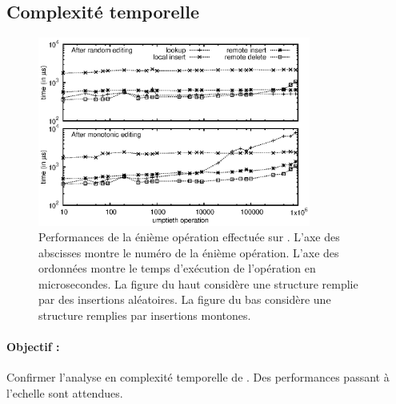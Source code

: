 \subsection{Complexité temporelle}

\begin{figure}
  \begin{center}
    \includegraphics[width=0.8\textwidth]{img/lseq/time.eps}
    \caption[Performances de \LSEQ] {\label{repl:img:time} Performances de la
      énième opération effectuée sur \LSEQ. L'axe des abscisses montre le numéro
      de la énième opération. L'axe des ordonnées montre le temps d'exécution de
      l'opération en microsecondes. La figure du haut considère une structure
      remplie par des insertions aléatoires. La figure du bas considère une
      structure remplies par insertions montones.}
  \end{center}
\end{figure}

\paragraph{Objectif :} Confirmer l'analyse en complexité temporelle de
\LSEQ. Des performances passant à l'echelle sont attendues.

